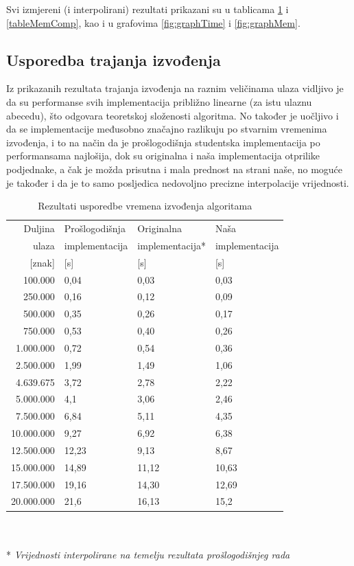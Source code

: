 \documentclass[a4paper,12pt]{article}
\begin{document}
Svi izmjereni (i interpolirani) rezultati prikazani su u tablicama \ref{tableTimeComp} i \ref{tableMemComp}, kao i u grafovima \ref{fig:graphTime} i \ref{fig:graphMem}.

\subsection{Usporedba trajanja izvođenja}

Iz prikazanih rezultata trajanja izvođenja na raznim veličinama ulaza vidljivo je da su performanse svih implementacija približno linearne (za istu ulaznu abecedu), što odgovara teoretskoj složenosti algoritma. No također je uočljivo i da se implementacije međusobno značajno razlikuju po stvarnim vremenima izvođenja, i to na način da je prošlogodišnja studentska implementacija po performansama najlošija, dok su originalna i naša implementacija otprilike podjednake, a čak je možda prisutna i mala prednost na strani naše, no moguće je također i da je to samo posljedica nedovoljno precizne interpolacije vrijednosti.

\begin{table}[h!]
	\caption{Rezultati usporedbe vremena izvođenja algoritama}
	\label{tableTimeComp}
	\begin{center}
		\begin{tabular}{rlll}
			\toprule
			Duljina & Prošlogodišnja & Originalna & Naša \\
			ulaza & implementacija & implementacija* & implementacija \\
			{[znak]} & [s] & [s] & [s] \\
			\midrule
			100.000	   	& 	0,04 	&	0,03		&	0,03 \\
			250.000		& 	0,16	&	0,12		&	0,09 \\
			500.000		& 	0,35	&	0,26		&	0,17 \\
			750.000		& 	0,53	&	0,40		&	0,26 \\
			1.000.000	& 	0,72	&	0,54		&	0,36 \\
			2.500.000	& 	1,99	&	1,49		&	1,06 \\
			4.639.675	& 	3,72	&	2,78		&	2,22 \\
			5.000.000	& 	4,1		&	3,06		&	2,46 \\
			7.500.000	& 	6,84	&	5,11		&	4,35 \\
			10.000.000	& 	9,27	&	6,92		&	6,38 \\
			12.500.000	& 	12,23	&	9,13		&	8,67 \\
			15.000.000	& 	14,89	&	11,12		&	10,63 \\
			17.500.000	& 	19,16	&	14,30		&	12,69 \\
			20.000.000	& 	21,6	&	16,13		&	15,2 \\
			\bottomrule
		\end{tabular}\\ ~ \\
		* \textit{Vrijednosti interpolirane na temelju rezultata prošlogodišnjeg rada}
	\end{center}
\end{table}
\end{document}
